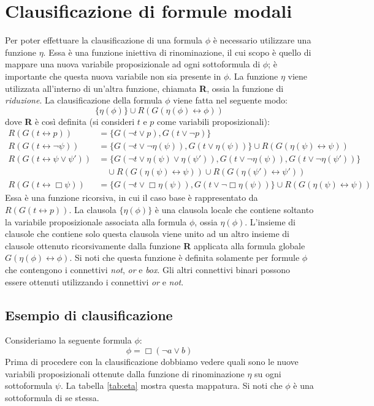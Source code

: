 \documentclass[a4paper,12pt]{report}
\newcommand{\tto} {\leftrightarrow}
\begin{document}
\section{Clausificazione di formule modali}
\label{modal_claus}
Per poter effettuare la clausificazione di una formula $\phi$ è necessario utilizzare una funzione $\eta$. Essa è una funzione iniettiva di rinominazione, il cui scopo è quello di mappare una nuova variabile proposizionale ad ogni sottoformula di $\phi$; è importante che questa nuova variabile non sia presente in $\phi$. La funzione $\eta$ viene utilizzata all'interno di un'altra funzione, chiamata \textbf{R}, ossia la funzione di \emph{riduzione}. La clausificazione della formula $\phi$ viene fatta nel seguente modo:
\[ \{ \eta(\phi) \} \cup R(G(\eta(\phi) \tto \phi)) \]
dove \textbf{R} è così definita (si consideri $t$ e $p$ come variabili proposizionali):
\[
\begin{aligned}
R(G(t \tto p)) &= \{ G(\lnot t \lor p), G(t \lor \lnot p) \} \\
R(G(t \tto \lnot \psi)) &= \{ G(\lnot t \lor \lnot \eta(\psi)), G(t \lor \eta(\psi)) \} \cup R(G(\eta(\psi) \tto \psi)) \\
R(G(t \tto \psi \lor \psi')) &= \{ G(\lnot t \lor \eta(\psi) \lor \eta(\psi')), G(t \lor \lnot \eta(\psi)), G(t \lor \lnot \eta(\psi')) \} \\
& \quad \cup R(G(\eta(\psi) \tto \psi)) \cup R(G(\eta(\psi') \tto \psi')) \\
R(G(t \tto \Box \psi)) &= \{ G(\lnot t \lor \Box \eta(\psi)), G(t \lor \lnot \Box \eta(\psi)) \} \cup R(G(\eta(\psi) \tto \psi))
\end{aligned}
\]
Essa è una funzione ricorsiva, in cui il caso base è rappresentato da $R(G(t \tto p))$. La clausola $\{\eta(\phi)\}$ è una clausola locale che contiene soltanto la variabile proposizionale associata alla formula $\phi$, ossia $\eta(\phi)$. L'insieme di clausole che contiene solo questa clausola viene unito ad un altro insieme di clausole ottenuto ricorsivamente dalla funzione \textbf{R} applicata alla formula globale $G(\eta(\phi) \tto \phi)$. Si noti che questa funzione è definita solamente per formule $\phi$ che contengono i connettivi \emph{not}, \emph{or} e \emph{box}. Gli altri connettivi binari possono essere ottenuti utilizzando i connettivi \emph{or} e \emph{not}.

\subsection{Esempio di clausificazione}
Consideriamo la seguente formula $\phi$:
\[
    \phi = \Box(\lnot a \lor b)
\]
Prima di procedere con la clausificazione dobbiamo vedere quali sono le nuove variabili proposizionali ottenute dalla funzione di rinominazione $\eta$ su ogni sottoformula $\psi$. La tabella \ref{tab:eta} mostra questa mappatura. Si noti che $\phi$ è una sottoformula di se stessa.
\end{document}
